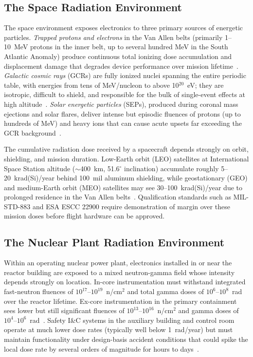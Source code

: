 \subsection{The Space Radiation Environment}

The space environment exposes electronics to three primary sources of
energetic particles.  \emph{Trapped protons and electrons} in the Van
Allen belts (primarily 1--10~MeV protons in the inner belt, up to
several hundred MeV in the South Atlantic Anomaly) produce continuous
total ionizing dose accumulation and displacement damage that
degrades device performance over mission lifetime~\cite{petersen2011single}.
\emph{Galactic cosmic rays} (GCRs) are fully ionized nuclei spanning
the entire periodic table, with energies from tens of MeV/nucleon to
above 10$^{20}$~eV; they are isotropic, difficult to shield, and
responsible for the bulk of single-event effects at high
altitude~\cite{ziegler1996terrestrial}.  \emph{Solar energetic particles}
(SEPs), produced during coronal mass ejections and solar flares, deliver
intense but episodic fluences of protons (up to hundreds of MeV) and
heavy ions that can cause acute upsets far exceeding the GCR
background~\cite{ecoffet2013inorbit}.

The cumulative radiation dose received by a spacecraft depends strongly
on orbit, shielding, and mission duration.  Low-Earth orbit (LEO)
satellites at International Space Station altitude ($\sim$400~km,
51.6$^\circ$ inclination) accumulate roughly 5--20~krad(Si)/year
behind 100~mil aluminum shielding, while geostationary (GEO) and
medium-Earth orbit (MEO) satellites may see 30--100~krad(Si)/year
due to prolonged residence in the Van Allen
belts~\cite{schwank2013radiation}.  Qualification standards such
as MIL-STD-883 and ESA ESCC 22900 require demonstration of margin
over these mission doses before flight hardware can be approved.

\subsection{The Nuclear Plant Radiation Environment}

Within an operating nuclear power plant, electronics installed in
or near the reactor building are exposed to a mixed neutron-gamma
field whose intensity depends strongly on location.  In-core
instrumentation must withstand integrated fast-neutron fluences
of $10^{17}$--$10^{19}$~n/cm$^2$ and total gamma doses of
$10^6$--$10^8$~rad over the reactor lifetime.  Ex-core
instrumentation in the primary containment sees lower but still
significant fluences of $10^{13}$--$10^{16}$~n/cm$^2$ and
gamma doses of $10^4$--$10^6$~rad~\cite{iaea2016design}.  Safety
I\&C systems in the auxiliary building and control room operate
at much lower dose rates (typically well below 1~rad/year) but
must maintain functionality under design-basis accident conditions
that could spike the local dose rate by several orders of
magnitude for hours to days~\cite{nrc1997digital}.

